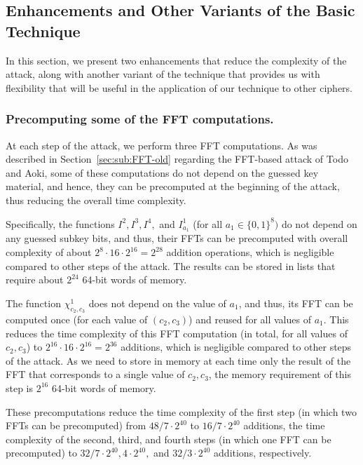 \subsection{Enhancements and Other Variants of the Basic Technique}
\label{sec:sub:improvements}

In this section, we present two enhancements that reduce the complexity of the attack, along with another variant of the technique that provides us with flexibility that will be useful in the application of our technique to other ciphers.

\subsubsection{Precomputing some of the FFT computations.} At each step of the attack, we perform three FFT computations. As was described in Section~\ref{sec:sub:FFT-old} regarding the FFT-based attack of Todo and Aoki, some of these computations do not depend on the guessed key material, and hence, they can be precomputed at the beginning of the attack, thus reducing the overall time complexity. 

Specifically, the functions $I^2,I^3,I^4,$ and $I^1_{a_1}$ (for all $a_1 \in \{0,1\}^8)$ do not depend on any guessed subkey bits, and thus, their FFTs can be precomputed with overall complexity of about $2^8 \cdot 16 \cdot 2^{16}=2^{28}$ addition operations, which is negligible compared to other steps of the attack. The results can be stored in lists that require about $2^{24}$ 64-bit words of memory.

The function $\chi^1_{c_2,c_3}$ does not depend on the value of $a_1$, and thus, its FFT can be computed once (for each value of $(c_2,c_3)$) and reused for all values of $a_1$. This reduces the time complexity of this FFT computation (in total, for all values of $c_2,c_3$) to $2^{16} \cdot 16 \cdot 2^{16}=2^{36}$ additions, which is negligible compared to other steps of the attack. As we need to store in memory at each time only the result of the FFT that corresponds to a single value of $c_2,c_3$, the memory requirement of this step is $2^{16}$ 64-bit words of memory. 

These precomputations reduce the time complexity of the first step (in which two FFTs can be precomputed) from $48/7 \cdot 2^{40}$ to $16/7 \cdot 2^{40}$ additions, the time complexity of the second, third, and fourth steps (in which one FFT can be precomputed) to $32/7 \cdot 2^{40}, 4 \cdot 2^{40},$ and $32/3 \cdot 2^{40}$ additions, respectively. 


